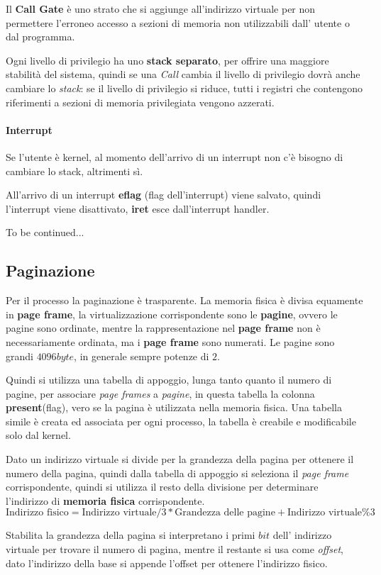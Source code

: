 Il \textbf{Call Gate} è uno strato che si aggiunge all'indirizzo virtuale per
non permettere l'erroneo accesso a sezioni di memoria non utilizzabili dall'
utente o dal programma.


Ogni livello di privilegio ha uno \textbf{stack separato}, per offrire una
maggiore stabilità del sistema, quindi se una \emph{Call} cambia il livello
di privilegio dovrà anche cambiare lo \emph{stack}: se il livello di privilegio
si riduce, tutti i registri che contengono riferimenti a sezioni di memoria
privilegiata vengono azzerati.


\paragraph{Interrupt}
Se l'utente è kernel, al momento dell'arrivo di un interrupt non c'è bisogno
di cambiare lo stack, altrimenti sì.

All'arrivo di un interrupt \textbf{eflag} (flag dell'interrupt) viene salvato,
quindi l'interrupt viene disattivato, \textbf{iret} esce dall'interrupt
handler.


To be continued...

\subsection{Paginazione}
Per il processo la paginazione è trasparente.
La memoria fisica è divisa equamente in \textbf{page frame}, la
virtualizzazione corrispondente sono le \textbf{pagine}, ovvero le pagine sono
ordinate, mentre la rappresentazione nel \textbf{page frame} non è
necessariamente ordinata, ma i \textbf{page frame} sono numerati.
Le pagine sono grandi $4096byte$, in generale sempre potenze di $2$.


Quindi si utilizza una tabella di appoggio, lunga tanto quanto il numero di
pagine, per associare \emph{page frames} a \emph{pagine}, in questa tabella la
colonna \textbf{present}(flag), vero se la pagina è utilizzata nella memoria
fisica.
Una tabella simile è creata ed associata per ogni processo, la tabella è
creabile e modificabile solo dal kernel.


Dato un indirizzo virtuale si divide per la grandezza della pagina per ottenere
il numero della pagina, quindi dalla tabella di appoggio si seleziona il \emph{
page frame} corrispondente, quindi si utilizza il resto della divisione per
determinare l'indirizzo di \textbf{memoria fisica} corrispondente.
\[
  \text{Indirizzo fisico} = \text{Indirizzo virtuale}/3 * \text{Grandezza delle
  pagine} + \text{Indirizzo virtuale} \% 3 
\]

Stabilita la grandezza della pagina si interpretano i primi $bit$ dell' 
indirizzo virtuale per trovare il numero di pagina, mentre il restante si usa
come \emph{offset}, dato l'indirizzo della base si appende l'offset per
ottenere l'indirizzo fisico.
